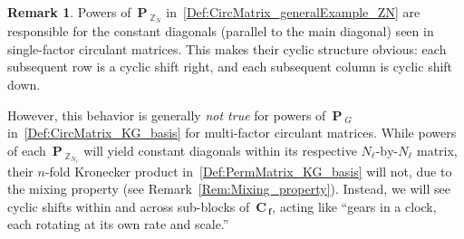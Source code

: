 \documentclass[letterpaper,11pt]{article}
\newcommand{\bs}[1]{{\boldsymbol{#1}}}
\newcommand{\Int}{\mathbb Z}
\newcommand{\Cbasis}{\bs{P}} %
\theoremstyle{definition} \newtheorem{remark}{Remark}
\begin{document}
\begin{remark}
Powers of~$\Cbasis_{\;\!\!\Int_N}$ in~\eqref{Def:CircMatrix_generalExample_ZN} are responsible for the constant diagonals (parallel to the main diagonal) seen in single-factor circulant matrices. This makes their cyclic structure obvious:
each subsequent row is a cyclic shift right, and each subsequent column is cyclic shift down.

However, this behavior is generally \emph{not true} for powers of~$\Cbasis_{\;\!\!G}$  in~\eqref{Def:CircMatrix_KG_basis} for multi-factor circulant matrices.
While powers of each~$\Cbasis_{\;\!\!\Int_{N_\ell}}$ will yield constant diagonals within its respective  $N_\ell\text{-by-}N_\ell$ matrix, their $n$-fold Kronecker product in~\eqref{Def:PermMatrix_KG_basis} will not, due to the mixing property (see Remark~\ref{Rem:Mixing_property}). Instead, we will see cyclic shifts within and across sub-blocks of~$\bs{C}_{\:\!\!\bs{f}}$, acting like ``gears in a clock, each rotating at its own rate and scale.''
\end{remark}
\end{document}

